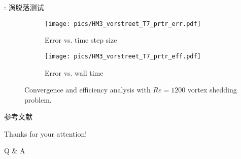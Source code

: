 \documentclass[aspectratio=169,serif]{beamer} %
\begin{document}
\begin{frame}{\secname: 涡脱落测试}
  \scriptsize
  \begin{figure}[htbp]
    \centering
    \begin{subfigure}{0.5\textwidth}
      \texttt{[image: pics/HM3\_vorstreet\_T7\_prtr\_err.pdf]}
      \caption[]{Error vs. time step size}
      \label{sfig:Cylinder_u2r2Pretest_err}
    \end{subfigure}\hfill
    \begin{subfigure}{0.5\textwidth}
      \texttt{[image: pics/HM3\_vorstreet\_T7\_prtr\_eff.pdf]}
      \caption[]{Error vs. wall time}
      \label{sfig:Cylinder_u2r2Pretest_eff}
    \end{subfigure}
    \caption[]{Convergence and efficiency analysis with $Re=1200$ vortex shedding problem.}
    \label{fig:Cylinder_u2r2Pretest}
  \end{figure}
\end{frame}



\renewcommand\refname{参考文献}
\begin{frame}[allowframebreaks]{参考文献}
  
  
\end{frame}

\begin{frame}
  \begin{center}
    {\Huge\calligra Thanks for your attention!}
    \vspace{1cm}

    {\Huge Q \& A}
  \end{center}
\end{frame}

\end{document}
